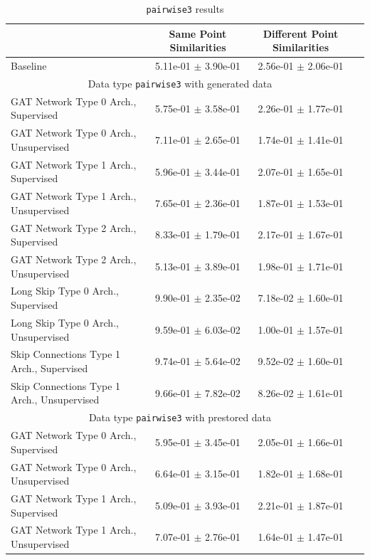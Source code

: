 \documentclass[a4paper]{article}
\begin{document}
\begin{table}[H]
  \caption{\texttt{pairwise3} results}
      \begin{tabular}{|l|c|c|c|} \hline
                                      &  Same Point Similarities  &  Different Point Similarities  \\ \hline
Baseline   & 5.11e-01 $\pm$ 3.90e-01 & 2.56e-01 $\pm$ 2.06e-01 \\ \hline
\multicolumn{3}{|c|}{Data type \texttt{pairwise3} with generated data} \\ \hline
GAT Network Type 0 Arch., Supervised   & 5.75e-01 $\pm$ 3.58e-01 & 2.26e-01 $\pm$ 1.77e-01 \\ \hline
GAT Network Type 0 Arch., Unsupervised   & 7.11e-01 $\pm$ 2.65e-01 & 1.74e-01 $\pm$ 1.41e-01 \\ \hline
GAT Network Type 1 Arch., Supervised   & 5.96e-01 $\pm$ 3.44e-01 & 2.07e-01 $\pm$ 1.65e-01 \\ \hline
GAT Network Type 1 Arch., Unsupervised   & 7.65e-01 $\pm$ 2.36e-01 & 1.87e-01 $\pm$ 1.53e-01 \\ \hline
GAT Network Type 2 Arch., Supervised   & 8.33e-01 $\pm$ 1.79e-01 & 2.17e-01 $\pm$ 1.67e-01 \\ \hline
GAT Network Type 2 Arch., Unsupervised   & 5.13e-01 $\pm$ 3.89e-01 & 1.98e-01 $\pm$ 1.71e-01 \\ \hline
Long Skip Type 0 Arch., Supervised   & 9.90e-01 $\pm$ 2.35e-02 & 7.18e-02 $\pm$ 1.60e-01 \\ \hline
Long Skip Type 0 Arch., Unsupervised   & 9.59e-01 $\pm$ 6.03e-02 & 1.00e-01 $\pm$ 1.57e-01 \\ \hline
Skip Connections Type 1 Arch., Supervised   & 9.74e-01 $\pm$ 5.64e-02 & 9.52e-02 $\pm$ 1.60e-01 \\ \hline
Skip Connections Type 1 Arch., Unsupervised   & 9.66e-01 $\pm$ 7.82e-02 & 8.26e-02 $\pm$ 1.61e-01 \\ \hline
\multicolumn{3}{|c|}{Data type \texttt{pairwise3} with prestored data} \\ \hline
GAT Network Type 0 Arch., Supervised   & 5.95e-01 $\pm$ 3.45e-01 & 2.05e-01 $\pm$ 1.66e-01 \\ \hline
GAT Network Type 0 Arch., Unsupervised   & 6.64e-01 $\pm$ 3.15e-01 & 1.82e-01 $\pm$ 1.68e-01 \\ \hline
GAT Network Type 1 Arch., Supervised   & 5.09e-01 $\pm$ 3.93e-01 & 2.21e-01 $\pm$ 1.87e-01 \\ \hline
GAT Network Type 1 Arch., Unsupervised   & 7.07e-01 $\pm$ 2.76e-01 & 1.64e-01 $\pm$ 1.47e-01 \\ \hline

\end{tabular}
\end{table}
\end{document}
